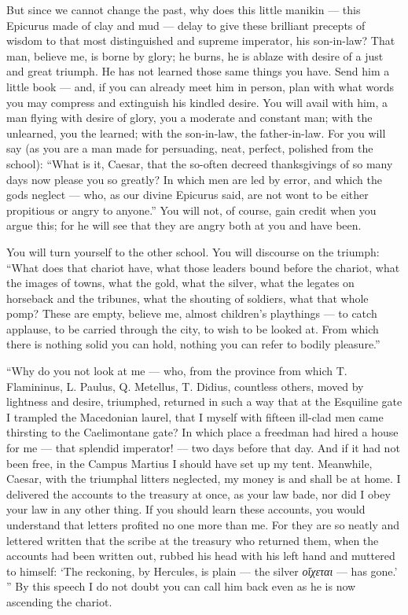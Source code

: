  But since we cannot change the past, why does this little manikin — this Epicurus made of clay and mud — delay to give these brilliant precepts of wisdom to that most distinguished and supreme imperator, his son-in-law? That man, believe me, is borne by glory; he burns, he is ablaze with desire of a just and great triumph. He has not learned those same things you have. Send him a little book — and, if you can already meet him in person, plan with what words you may compress and extinguish his kindled desire. You will avail with him, a man flying with desire of glory, you a moderate and constant man; with the unlearned, you the learned; with the son-in-law, the father-in-law. For you will say (as you are a man made for persuading, neat, perfect, polished from the school): ``What is it, Caesar, that the so-often decreed thanksgivings of so many days now please you so greatly? In which men are led by error, and which the gods neglect — who, as our divine Epicurus said, are not wont to be either propitious or angry to anyone.'' You will not, of course, gain credit when you argue this; for he will see that they are angry both at you and have been.

 You will turn yourself to the other school. You will discourse on the triumph: ``What does that chariot have, what those leaders bound before the chariot, what the images of towns, what the gold, what the silver, what the legates on horseback and the tribunes, what the shouting of soldiers, what that whole pomp? These are empty, believe me, almost children's playthings — to catch applause, to be carried through the city, to wish to be looked at. From which there is nothing solid you can hold, nothing you can refer to bodily pleasure.''

 ``Why do you not look at me — who, from the province from which T. Flamininus, L. Paulus, Q. Metellus, T. Didius, countless others, moved by lightness and desire, triumphed, returned in such a way that at the Esquiline gate I trampled the Macedonian laurel, that I myself with fifteen ill-clad men came thirsting to the Caelimontane gate? In which place a freedman had hired a house for me — that splendid imperator! — two days before that day. And if it had not been free, in the Campus Martius I should have set up my tent. Meanwhile, Caesar, with the triumphal litters neglected, my money is and shall be at home. I delivered the accounts to the treasury at once, as your law bade, nor did I obey your law in any other thing. If you should learn these accounts, you would understand that letters profited no one more than me. For they are so neatly and lettered written that the scribe at the treasury who returned them, when the accounts had been written out, rubbed his head with his left hand and muttered to himself: `The reckoning, by Hercules, is plain — the silver \textit{οἴχεται} — has gone.' '' By this speech I do not doubt you can call him back even as he is now ascending the chariot.

